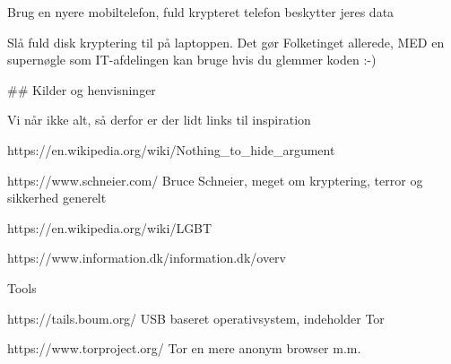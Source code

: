 \documentclass[20pt,landscape,a4paper,footrule]{foils}
\begin{document}
Brug en nyere mobiltelefon, fuld krypteret telefon beskytter jeres data

Slå fuld disk kryptering til på laptoppen. Det gør Folketinget allerede, MED en supernøgle som IT-afdelingen kan bruge hvis du glemmer koden :-)


## Kilder og henvisninger

Vi når ikke alt, så derfor er der lidt links til inspiration

https://en.wikipedia.org/wiki/Nothing_to_hide_argument

https://www.schneier.com/ Bruce Schneier, meget om kryptering, terror og sikkerhed generelt

https://en.wikipedia.org/wiki/LGBT

https://www.information.dk/information.dk/overv%

Tools

https://tails.boum.org/ USB baseret operativsystem, indeholder Tor

https://www.torproject.org/ Tor en mere anonym browser m.m.
\end{document}
